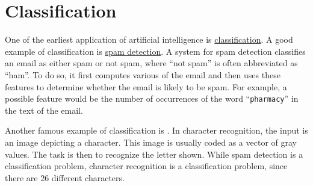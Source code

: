 \chapter{Classification \label{chapter:classification}}
One of the earliest application of artificial intelligence is 
\href{https://en.wikipedia.org/wiki/Statistical_classification}{classification}.  A good
example of classification is \href{https://en.wikipedia.org/wiki/Anti-spam_techniques#Detecting_spam}{spam detection}.
A system for spam detection classifies an email as either spam or not spam, where ``not spam'' is often
abbreviated as ``ham''.  To do so, it first
computes various   of the email and then uses these features to determine whether
the email is likely to be spam.  For example, a possible feature would be the number of occurrences of the word
``\texttt{pharmacy}'' in the text of the email.

Another famous example of classification is .  In character recognition, the
input is an image depicting a character.  This image is usually coded as a vector of gray values.  The task is
then to recognize the letter shown.  While spam detection is a  classification problem, character
recognition is a  classification problem, since there are 26 different characters.

